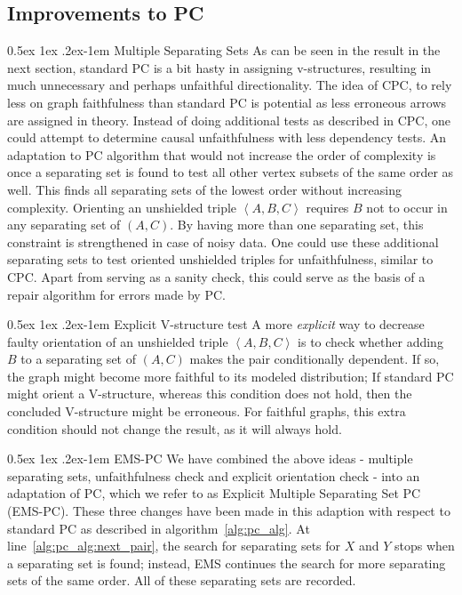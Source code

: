 \documentclass[a4paper, 10pt, english, onecolumn]{article}
\makeatletter
\renewcommand{\paragraph}{%
  \@startsection{paragraph}{4}%
  {\z@}{0.5ex \@plus 1ex \@minus .2ex}{-1em}%
  {\normalfont\normalsize\bfseries}%
}
\makeatother
\begin{document}
\subsection{Improvements to PC}
\paragraph{Multiple Separating Sets}
As can be seen in the result in the next section, standard PC is a bit hasty in assigning v-structures, resulting in much unnecessary and perhaps unfaithful directionality.
The idea of CPC, to rely less on graph faithfulness than standard PC is potential as less erroneous arrows are assigned in theory.
Instead of doing additional tests as described in CPC, one could attempt to determine causal unfaithfulness with less dependency tests.
An adaptation to PC algorithm that would not increase the order of complexity is once a separating set is found to test all other vertex subsets of the same order as well.
This finds all separating sets of the lowest order without increasing complexity.
Orienting an unshielded triple $\left<A,B,C\right>$ requires $B$ not to occur in any separating set of $(A,C)$.
By having more than one separating set, this constraint is strengthened in case of noisy data.
One could use these additional separating sets to test oriented unshielded triples for unfaithfulness, similar to CPC.
Apart from serving as a sanity check, this could serve as the basis of a repair algorithm for errors made by PC.

\paragraph{Explicit V-structure test}
A more \textit{explicit} way to decrease faulty orientation of an unshielded triple $\left<A,B,C\right>$ is to check whether adding $B$ to a separating set of $(A,C)$ makes the pair conditionally dependent.
If so, the graph might become more faithful to its modeled distribution; If standard PC might orient a V-structure, whereas this condition does not hold, then the concluded V-structure might be erroneous.
For faithful graphs, this extra condition should not change the result, as it will always hold.

\paragraph{EMS-PC}
We have combined the above ideas - multiple separating sets, unfaithfulness check and explicit orientation check - into an adaptation of PC, which we refer to as Explicit Multiple Separating Set PC (EMS-PC).
These three changes have been made in this adaption with respect to standard PC as described in algorithm~\ref{alg:pc_alg}.
At line~\ref{alg:pc_alg:next_pair}, the search for separating sets for $X$ and $Y$ stops when a separating set is found; instead, EMS continues the search for more separating sets of the same order.
All of these separating sets are recorded.
\end{document}
